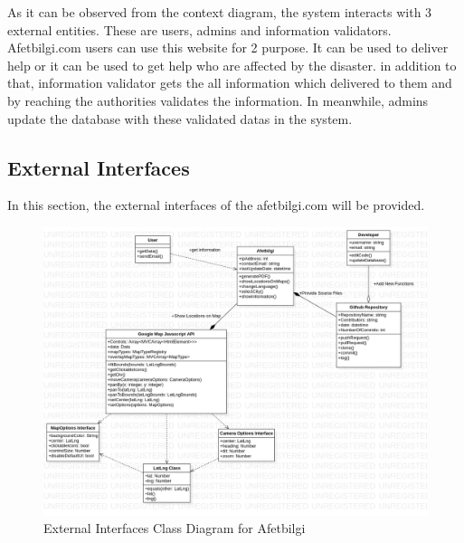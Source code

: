 As it can be observed from the context diagram, the system interacts with 3 external entities. These are users, admins and information validators. Afetbilgi.com users can use this website for 2 purpose. It can be used to deliver help or it can be used to get help who are affected by the disaster.
in addition to that, information validator gets the all information which delivered to them and by reaching the authorities validates the information. In meanwhile, admins update the database with these validated datas in the system.

\subsection{External Interfaces}

In this section, the external interfaces of the afetbilgi.com will be provided.

\begin{figure}[H]
    \includegraphics[scale = 0.4]{assets/externalInterfaces.png}
    \caption[External Interfaces Class Diagram for Afetbilgi]{External Interfaces Class Diagram for Afetbilgi}
\end{figure}

